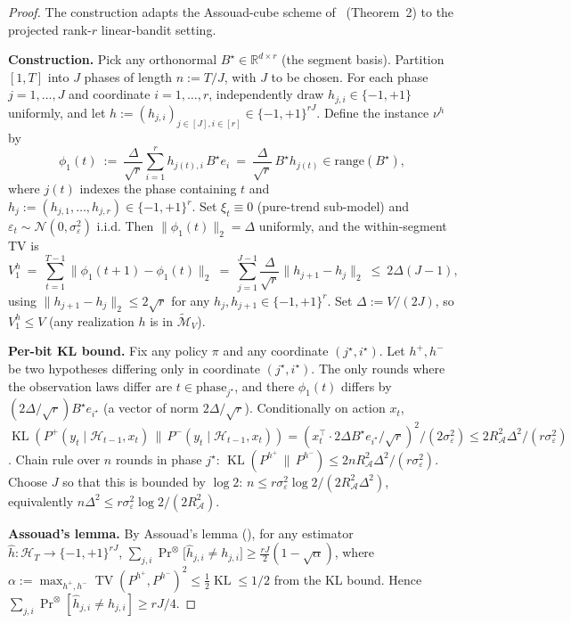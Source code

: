 \documentclass[11pt]{article}
\newcommand{\R}{\mathbb{R}}
\newcommand{\cA}{\mathcal{A}}
\newcommand{\cH}{\mathcal{H}}
\newcommand{\range}{\mathrm{range}}
\DeclareMathOperator{\KL}{KL}
\DeclareMathOperator{\TV}{TV}
\begin{document}
\begin{proof}
The construction adapts the Assouad-cube scheme of~\citet{cheung2019learning}
(Theorem~2) to the projected rank-$r$ linear-bandit setting.

\textbf{Construction.}
Pick any orthonormal $B^\star\in\R^{d\times r}$ (the segment basis).  Partition
$[1,T]$ into $J$ phases of length $n:=T/J$, with $J$ to be chosen.  For each
phase $j=1,\ldots,J$ and coordinate $i=1,\ldots,r$, independently draw
$h_{j,i}\in\{-1,+1\}$ uniformly, and let $h:=(h_{j,i})_{j\in[J],i\in[r]}\in\{-1,+1\}^{rJ}$.
Define the instance $\nu^h$ by
\[
  \phi_1(t)\ :=\ \frac{\Delta}{\sqrt r}\sum_{i=1}^r h_{j(t),i}\,B^\star e_i
  \ =\ \frac{\Delta}{\sqrt r}\,B^\star h_{j(t)}\in\range(B^\star),
\]
where $j(t)$ indexes the phase containing $t$ and $h_{j}:=(h_{j,1},\ldots,h_{j,r})\in\{-1,+1\}^r$.
Set $\xi_t\equiv 0$ (pure-trend sub-model) and
$\varepsilon_t\sim\mathcal N(0,\sigma_\varepsilon^2)$ i.i.d.  Then
$\|\phi_1(t)\|_2=\Delta$ uniformly, and the within-segment TV is
\[
  V_1^h\ =\ \sum_{t=1}^{T-1}\|\phi_1(t+1)-\phi_1(t)\|_2
  \ =\ \sum_{j=1}^{J-1}\frac{\Delta}{\sqrt r}\|h_{j+1}-h_j\|_2
  \ \le\ 2\Delta(J-1),
\]
using $\|h_{j+1}-h_j\|_2\le 2\sqrt r$ for any $h_j,h_{j+1}\in\{-1,+1\}^r$.  Set
$\Delta:=V/(2J)$, so $V_1^h\le V$ (any realization $h$ is in
$\widetilde{\mathcal M}_V$).

\textbf{Per-bit KL bound.}
Fix any policy $\pi$ and any coordinate $(j^\star,i^\star)$.  Let $h^{+},h^{-}$
be two hypotheses differing only in coordinate $(j^\star,i^\star)$.  The only
rounds where the observation laws differ are $t\in\mathrm{phase}_{j^\star}$,
and there $\phi_1(t)$ differs by $(2\Delta/\sqrt r)B^\star e_{i^\star}$ (a vector
of norm $2\Delta/\sqrt r$).  Conditionally on action $x_t$,
$\KL(P^+(y_t\mid\cH_{t-1},x_t)\,\|\,P^-(y_t\mid\cH_{t-1},x_t))
=(x_t^\top\cdot 2\Delta B^\star e_{i^\star}/\sqrt r)^2/(2\sigma_\varepsilon^2)\le
2R_\cA^2\Delta^2/(r\sigma_\varepsilon^2)$.
Chain rule over $n$ rounds in phase $j^\star$:
$\KL(P^{h^+}\,\|\,P^{h^-})\le 2 n R_\cA^2\Delta^2/(r\sigma_\varepsilon^2)$.
Choose $J$ so that this is bounded by $\log 2$: $n\le r\sigma_\varepsilon^2\log 2/(2R_\cA^2\Delta^2)$,
equivalently $n\Delta^2\le r\sigma_\varepsilon^2\log 2/(2R_\cA^2)$.

\textbf{Assouad's lemma.}
By Assouad's lemma (\citet[Lemma~2.12]{tsybakov2009introduction}), for any
estimator $\widehat h:\cH_T\to\{-1,+1\}^{rJ}$,
$\sum_{j,i}\Pr^{\otimes}\!\bigl[\widehat h_{j,i}\ne h_{j,i}\bigr]\ge
\tfrac{rJ}{2}(1-\sqrt{\alpha})$, where $\alpha:=\max_{h^+,h^-}\TV(P^{h^+},P^{h^-})^2\le
\tfrac12\KL\le 1/2$ from the KL bound.  Hence
$\sum_{j,i}\Pr^\otimes[\widehat h_{j,i}\ne h_{j,i}]\ge rJ/4$.


\end{proof}
\end{document}
